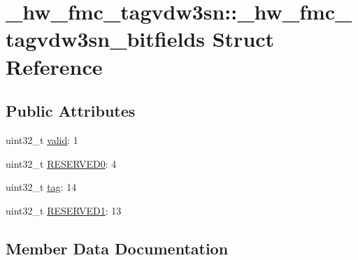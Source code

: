 \hypertarget{struct__hw__fmc__tagvdw3sn_1_1__hw__fmc__tagvdw3sn__bitfields}{}\section{\+\_\+hw\+\_\+fmc\+\_\+tagvdw3sn\+:\+:\+\_\+hw\+\_\+fmc\+\_\+tagvdw3sn\+\_\+bitfields Struct Reference}
\label{struct__hw__fmc__tagvdw3sn_1_1__hw__fmc__tagvdw3sn__bitfields}
\subsection*{Public Attributes}
\begin{DoxyCompactItemize}
\item 
uint32\+\_\+t \hyperlink{struct__hw__fmc__tagvdw3sn_1_1__hw__fmc__tagvdw3sn__bitfields_abb2367f8d72c81b9c47a82f7b8381187}{valid}\+: 1
\item 
uint32\+\_\+t \hyperlink{struct__hw__fmc__tagvdw3sn_1_1__hw__fmc__tagvdw3sn__bitfields_aa5985aa83129d5a2a9092fd8fc95ca2b}{R\+E\+S\+E\+R\+V\+E\+D0}\+: 4
\item 
uint32\+\_\+t \hyperlink{struct__hw__fmc__tagvdw3sn_1_1__hw__fmc__tagvdw3sn__bitfields_a67112a066fba0fe1d75e8ac8606265e6}{tag}\+: 14
\item 
uint32\+\_\+t \hyperlink{struct__hw__fmc__tagvdw3sn_1_1__hw__fmc__tagvdw3sn__bitfields_aba7cad0a23c731f24af47e263bc526ac}{R\+E\+S\+E\+R\+V\+E\+D1}\+: 13
\end{DoxyCompactItemize}


\subsection{Member Data Documentation}
